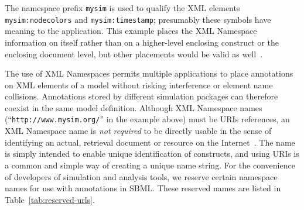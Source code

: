 \documentclass[10pt]{cekarticle}
\newcommand{\vref}[1]{\ref{#1}}
\newcommand{\changed}[1]{\textcolor{BrickRed}{#1}}
\begin{document}
The namespace prefix \texttt{mysim} is used to qualify the XML elements
\texttt{mysim:nodecolors} and \texttt{mysim:timestamp}; presumably these
symbols have meaning to the application.  This example places the XML
Namespace information on \changed{} itself rather than
on a higher-level enclosing construct or the enclosing document level, but
other placements would be valid as well~\citep{bray:1999}.

The use of XML Namespaces permits multiple applications to place
annotations on XML elements of a model without risking interference or
element name collisions.  Annotations stored by different simulation
packages can therefore coexist in the same model definition.  Although XML
Namespace names (``\texttt{http://www.mysim.org/}'' in the example above)
must be URIs references, an XML Namespace name is \emph{not required} to be
directly usable in the sense of identifying an actual, retrieval document
or resource on the Internet~\citep{bray:1999}.  The name is simply intended
to enable unique identification of constructs, and using URIs is a common
and simple way of creating a unique name string.  For the convenience of
\changed{developers of simulation and analysis tools}, we reserve certain
namespace names for use with annotations in SBML.  These reserved names are
listed in Table~\vref{tab:reserved-urls}.
\end{document}
